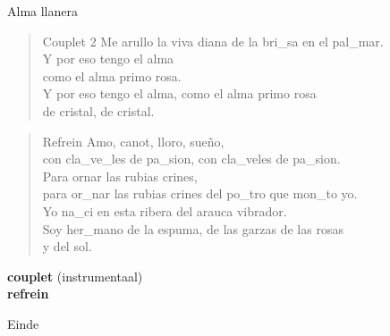 \begin{song}[joropo]{Alma llanera}
\begin{verse}{Couplet 2}
Me arullo la viva diana de la bri\_sa en el   pal\_mar.  \hspace{1em} \hspace{1em}  \hspace{1em}\\
  Y por eso tengo el alma  \hspace{1em} \hspace{1em}  \hspace{1em}\\
  como el alma primo rosa.  \hspace{1em} \hspace{1em}  \hspace{1em}\\
  Y por eso tengo el alma, como el alma primo rosa\\
de cristal, de cristal.  \\
\end{verse}

\begin{verse}{Refrein}
Amo, canot, lloro, sue\~no,\chord{}\\
con cla\_ve\_les de pa\_sion, con cla\_veles de pa\_sion.\\
Para ornar las rubias crines,\\
para or\_nar las rubias crines del po\_tro que mon\_to yo.\\
Yo na\_ci en esta ribera del arauca vibrador.\\
Soy her\_mano de la espuma, de las garzas de las rosas   \\
y del sol.\\
\end{verse}

\textbf{couplet} (instrumentaal)\\
\textbf{refrein}\\
\begin{instrumental}{Einde}
            
\end{instrumental}
\end{song}
